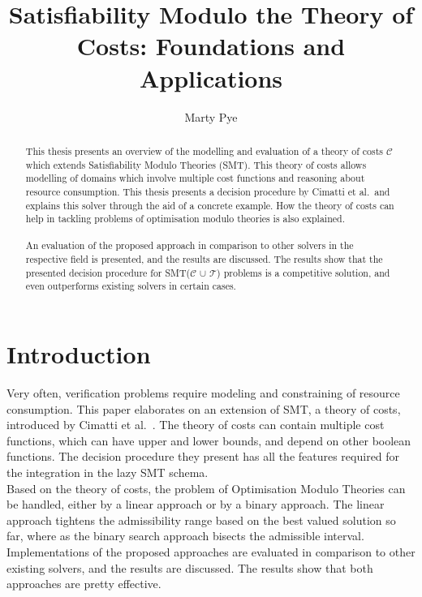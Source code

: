 \documentclass{amsart}
\theoremstyle{definition}
\theoremstyle{remark}
\numberwithin{equation}{section}
\def\T{$\mathcal{T}$}
\def\C{$\mathcal{C}$}
\begin{document}
  \title[Satisfiability Modulo the Theory of Costs]{Satisfiability Modulo the Theory of Costs: Foundations and Applications}

  \author{Marty Pye}
  \address{RWTH Aachen University}

  \begin{abstract}
    This thesis presents an overview of the modelling and evaluation of a theory of costs \C{} which extends Satisfiability Modulo Theories (SMT). This theory of costs allows modelling of domains which involve multiple cost functions and reasoning about resource consumption. This thesis presents a decision procedure by Cimatti et al.\ and explains this solver through the aid of a concrete example. How the theory of costs can help in tackling problems of optimisation modulo theories is also explained.
    \\\\
    An evaluation of the proposed approach in comparison to other solvers in the respective field is presented, and the results are discussed. The results show that the presented decision procedure for SMT(\C{} $\cup$ \T{}) problems is a competitive solution, and even outperforms existing solvers in certain cases.
  \end{abstract}

  \maketitle

  \section{Introduction}

  Very often, verification problems require modeling and constraining of resource consumption. This paper elaborates on an extension of SMT, a theory of costs, introduced by Cimatti et al.\ \cite{Cimatti10}. The theory of costs can contain multiple cost functions, which can have upper and lower bounds, and depend on other boolean functions. The decision procedure they present has all the features required for the integration in the lazy SMT schema. \\
  
  Based on the theory of costs, the problem of Optimisation Modulo Theories can be handled, either by a linear approach or by a binary approach. The linear approach tightens the admissibility range based on the best valued solution so far, where as the binary search approach bisects the admissible interval.
  Implementations of the proposed approaches are evaluated in comparison to other existing solvers, and the results are discussed. The results show that both approaches are pretty effective.\\
  
\end{document}
